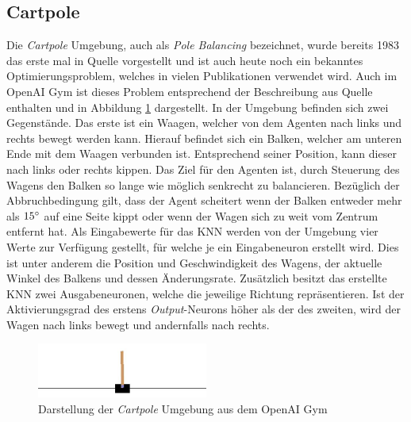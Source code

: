 \subsection{Cartpole}
Die \emph{Cartpole} Umgebung, auch als \emph{Pole Balancing} bezeichnet, wurde bereits 1983 das erste mal in Quelle \cite{barto1983neuronlike} vorgestellt und ist auch heute noch ein bekanntes Optimierungsproblem, welches in vielen Publikationen verwendet wird. Auch im OpenAI Gym ist dieses Problem entsprechend der Beschreibung aus Quelle \cite{barto1983neuronlike} enthalten und in Abbildung \ref{fig:cartpole_environment} dargestellt. In der Umgebung befinden sich zwei Gegenstände. Das erste ist ein Waagen, welcher von dem Agenten nach links und rechts bewegt werden kann. Hierauf befindet sich ein Balken, welcher am unteren Ende mit dem Waagen verbunden ist. Entsprechend seiner Position, kann dieser nach links oder rechts kippen. Das Ziel für den Agenten ist, durch Steuerung des Wagens den Balken so lange wie möglich senkrecht zu balancieren. Bezüglich der Abbruchbedingung gilt, dass der Agent scheitert wenn der Balken entweder mehr als $15\degree$ auf eine Seite kippt oder wenn der Wagen sich zu weit vom Zentrum entfernt hat. Als Eingabewerte für das \ac{KNN} werden von der Umgebung vier Werte zur Verfügung gestellt, für welche je ein Eingabeneuron erstellt wird. Dies ist unter anderem die Position und Geschwindigkeit des Wagens, der aktuelle Winkel des Balkens und dessen Änderungsrate. Zusätzlich besitzt das erstellte \ac{KNN} zwei Ausgabeneuronen, welche die jeweilige Richtung repräsentieren. Ist der Aktivierungsgrad des erstens \emph{Output}-Neurons höher als der des zweiten, wird der Wagen nach links bewegt und andernfalls nach rechts.
\begin{figure}[!h]
	\centering
	\includegraphics[width=0.5\textwidth]{./img/cartpole_env.JPG} 
	\caption{Darstellung der \emph{Cartpole} Umgebung aus dem OpenAI Gym}
	\label{fig:cartpole_environment}
\end{figure} 
